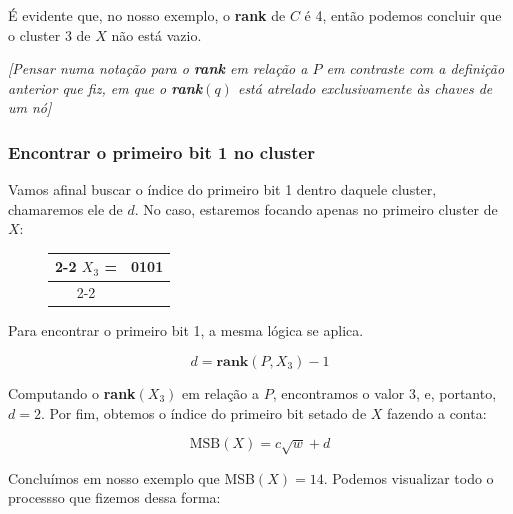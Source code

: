 É evidente que, no nosso exemplo, o \textbf{rank} de $C$ é 4, então podemos
concluir que o cluster 3 de $X$ não está vazio.

\textit{[Pensar numa notação para o \textbf{rank} em relação a $P$ em contraste
com a definição anterior que fiz, em que o \textbf{rank}$(q)$ está atrelado
exclusivamente às chaves de um nó]}

\subsubsection{Encontrar o primeiro bit 1 no cluster}

Vamos afinal buscar o índice do primeiro bit 1 dentro daquele cluster,
chamaremos ele de $d$. No caso, estaremos focando apenas no primeiro cluster de
$X$:

\begin{figure}[h]
 \bf \Large\centering
 \begin{tabular}{c|c|}
\cline{2-2}
\textcolor{PineGreen}{$X_3$} = &
\textcolor{PineGreen}{0101} \\
\cline{2-2}
  \end{tabular}
\end{figure}

Para encontrar o primeiro bit 1, a mesma lógica se aplica. 

\[
d=\textbf{rank}(P,X_3)-1
\]

Computando o \textbf{rank}$(X_3)$ em relação a $P$, encontramos o valor 3, e,
portanto, $d=2$. Por fim, obtemos o índice do primeiro bit setado de $X$ fazendo
a conta:

\[
\text{MSB}(X) = c\sqrt{w} + d
\]

Concluímos em nosso exemplo que MSB$(X)=14$. Podemos visualizar todo o processso
que fizemos dessa forma:

